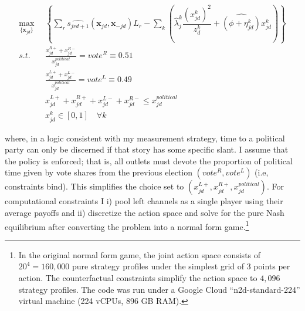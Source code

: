 \documentclass[12pt]{article}
\begin{document}
	
	
	
	\begin{equation}\label{eq:payoffs2}
		\begin{aligned}
			\max_{\{\bm{x}_{jd}\}}   & \left\{   \sum_{r}\widehat{s_{jrd+1}}(\bm{x}_{jd}, \bm{x}_{-jd})L_r - \sum_k \left({\hat{\lambda}_j^k}  \dfrac{(x_{jd}^k)^2}{z_{d}^k} + \widehat{\left(\phi+{\eta}_{jd}^k\right)} x_{jd}^k \right)  \right\}\\
			s.t.   \quad &   \frac{x_{jd}^{R+} + x_{jd}^{R-} }{x_{jd}^{political}}=vote^R\equiv0.51\\
			&  \frac{x_{jd}^{L+} + x_{jd}^{L-} }{x_{jd}^{political}}= vote^L\equiv0.49\\
			&  x_{jd}^{L+} +x_{jd}^{R+} + x_{jd}^{L-} + x_{jd}^{R-} \leq  x_{jd}^{political}\\
			& x_{jd}^k \in [0,1] \quad \forall k
		\end{aligned}
	\end{equation} 
	
	
	where, in a logic consistent with my measurement strategy, time to a political party can only be discerned if that story has some specific slant. I assume that the policy is enforced; that is, all outlets must devote the proportion of political time given by vote shares from the previous election $(vote^R, vote^L)$ (i.e, constraints bind). This simplifies the choice set to $\left( x_{jd}^{L+} ,x_{jd}^{R+} ,x_{jd}^{political}\right)$. For computational constraints I i) pool left channels as a single player using their average payoffs and ii) discretize the action space and solve for the pure Nash equilibrium after converting the problem into a normal form game.\footnote{ In the original normal form game, the joint action space consists of 	$20^4=160,000$  pure strategy profiles under the simplest grid of 3 points per action. The counterfactual constraints simplify the action space to $4,096$ strategy profiles.  The code was run under a Google Cloud “n2d-standard-224” virtual machine (224 vCPUs, 896 GB RAM).} 
	
	
\end{document}

